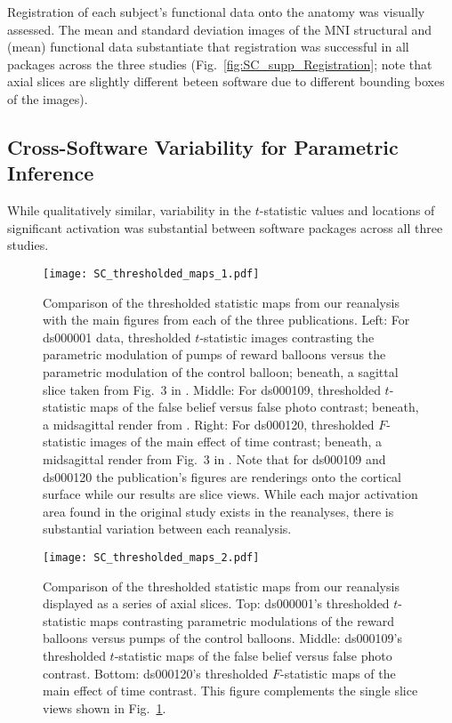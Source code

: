 Registration of each subject's functional data onto the anatomy was visually assessed. The mean and standard deviation images of the MNI structural and (mean) functional data substantiate that registration was successful in all packages across the three studies (Fig.\ \ref{fig:SC_supp_Registration}; note that axial slices are slightly different beteen software due to different bounding boxes of the images). 

\subsection{Cross-Software Variability for Parametric Inference}

While qualitatively similar, variability in the $t$-statistic values and locations of significant activation was substantial between software packages across all three studies. 

\begin{figure}[htbp]
\centering
	\texttt{[image: SC\_thresholded\_maps\_1.pdf]}	
\caption{Comparison of the thresholded statistic maps from our reanalysis with the main figures from each of the three publications. Left: For ds000001 data, thresholded $t$-statistic images contrasting the parametric modulation of pumps of reward balloons versus the parametric modulation of the control balloon; beneath, a sagittal slice taken from Fig.\ 3 in \citet{Schonberg2012-oo}. Middle: For ds000109, thresholded $t$-statistic maps of the false belief versus false photo contrast; beneath, a midsagittal render from \citet{Moran2012-cw}. Right: For ds000120, thresholded $F$-statistic images of the main effect of time contrast; beneath, a midsagittal render from Fig.\ 3 in \citet{Padmanabhan2011-dc}. Note that for ds000109 and ds000120 the publication's figures are renderings onto the cortical surface while our results are slice views. While each major activation area found in the original study exists in the reanalyses, there is substantial variation between each reanalysis.}
\label{fig:SC_thresholded_maps_1}
\end{figure}

\begin{figure}[htbp]
\centering
	\texttt{[image: SC\_thresholded\_maps\_2.pdf]}	
\caption{Comparison of the thresholded statistic maps from our reanalysis displayed as a series of axial slices. Top: ds000001's thresholded $t$-statistic maps contrasting parametric modulations of the reward balloons versus pumps of the control balloons. Middle: ds000109's thresholded $t$-statistic maps of the false belief versus false photo contrast. Bottom: ds000120's thresholded $F$-statistic maps of the main effect of time contrast. This figure complements the single slice views shown in Fig.\ \ref{fig:SC_thresholded_maps_1}.}
\label{fig:SC_thresholded_maps_2}
\end{figure}

